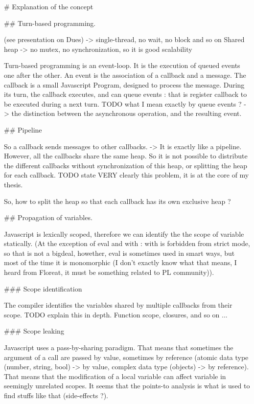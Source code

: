 # Explanation of the concept

## Turn-based programming.







(see presentation on Dues)
-> single-thread, no wait, no block and so on
Shared heap -> no mutex, no synchronization, so it is good scalability


Turn-based programming is an event-loop.
It is the execution of queued events one after the other.
An event is the association of a callback and a message.
The callback is a small Javascript Program, designed to process the message.
During its turn, the callback executes, and can queue events : that is register callback to be executed during a next turn.
TODO what I mean exactly by queue events ? -> the distinction between the asynchronous operation, and the resulting event.

## Pipeline

So a callback sends messages to other callbacks.
-> It is exactly like a pipeline.
However, all the callbacks share the same heap.
So it is not possible to distribute the different callbacks without synchronization of this heap, or splitting the heap for each callback.
TODO state VERY clearly this problem, it is at the core of my thesis.

So, how to split the heap so that each callback has its own exclusive heap ?

## Propagation of variables.

Javascript is lexically scoped, therefore we can identify the the scope of variable statically.
(At the exception of eval and with : with is forbidden from strict mode, so that is not a bigdeal, howether, eval is sometimes used in smart ways, but most of the time it is monomorphic (I don't exactly know what that means, I heard from Floreat, it must be something related to PL community)).

### Scope identification

The compiler identifies the variables shared by multiple callbacks from their scope.
TODO explain this in depth.
Function scope, closures, and so on ...

### Scope leaking

Javascript uses a pass-by-sharing paradigm.
That means that sometimes the argument of a call are passed by value, sometimes by reference (atomic data type (number, string, bool) -> by value, complex data type (objects) -> by reference).
That means that the modification of a local variable can affect variable in seemingly unrelated scopes.
It seems that the points-to analysis is what is used to find stuffs like that (side-effects ?).

